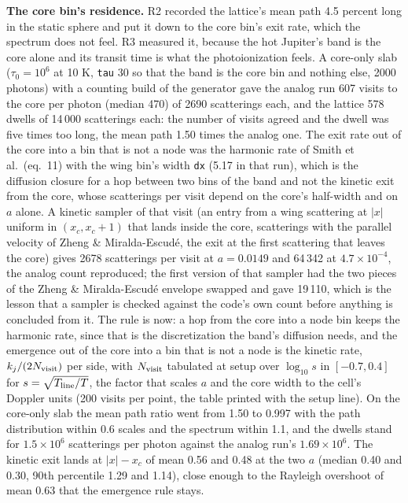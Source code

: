 \documentclass[11pt]{article}
\newcommand{\key}[1]{\texttt{#1}}
\begin{document}
\textbf{The core bin's residence.}  R2 recorded the lattice's mean path 4.5 percent
long in the static sphere and put it down to the core bin's exit rate, which the
spectrum does not feel.  R3 measured it, because the hot Jupiter's band is the core
alone and its transit time is what the photoionization feels.  A core-only slab
($\tau_0 = 10^6$ at 10 K, \key{tau} 30 so that the band is the core bin and nothing
else, 2000 photons) with a counting build of the generator gave the analog run 607
visits to the core per photon (median 470) of 2690 scatterings each, and the lattice
578 dwells of 14\,000 scatterings each: the number of visits agreed and the dwell was
five times too long, the mean path 1.50 times the analog one.  The exit rate out of
the core into a bin that is not a node was the harmonic rate of Smith et al.\ (eq.\
11) with the wing bin's width \key{dx} (5.17 in that run), which is the diffusion
closure for a hop between two bins of the band and not the kinetic exit from the
core, whose scatterings per visit depend on the core's half-width and on $a$ alone.
A kinetic sampler of that visit (an entry from a wing scattering at $|x|$ uniform in
$(x_c, x_c + 1)$ that lands inside the core, scatterings with the parallel velocity
of Zheng \& Miralda-Escud\'e, the exit at the first scattering that leaves the core)
gives 2678 scatterings per visit at $a = 0.0149$ and 64\,342 at $4.7\times10^{-4}$,
the analog count reproduced; the first version of that sampler had the two pieces of
the Zheng \& Miralda-Escud\'e envelope swapped and gave 19\,110, which is the lesson
that a sampler is checked against the code's own count before anything is concluded
from it.  The rule is now: a hop from the core into a node bin keeps the harmonic
rate, since that is the discretization the band's diffusion needs, and the emergence
out of the core into a bin that is not a node is the kinetic rate,
$k_j/(2N_{\rm visit})$ per side, with $N_{\rm visit}$ tabulated at setup over
$\log_{10} s$ in $[-0.7, 0.4]$ for $s = \sqrt{T_{\rm line}/T}$, the factor that
scales $a$ and the core width to the cell's Doppler units (200 visits per point, the
table printed with the setup line).  On the core-only slab the mean path ratio went
from 1.50 to 0.997 with the path distribution within 0.6 scales and the spectrum
within 1.1, and the dwells stand for $1.5\times10^6$ scatterings per photon against
the analog run's $1.69\times10^6$.  The kinetic exit lands at $|x| - x_c$ of mean
0.56 and 0.48 at the two $a$ (median 0.40 and 0.30, 90th percentile 1.29 and 1.14),
close enough to the Rayleigh overshoot of mean 0.63 that the emergence rule stays.
\end{document}
